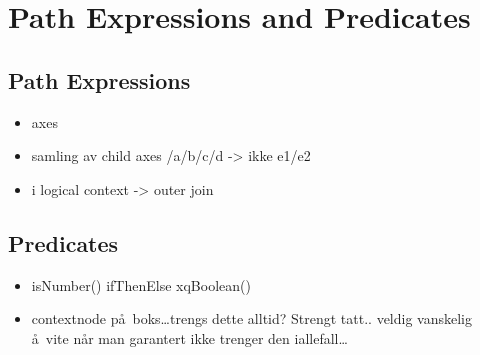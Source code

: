\section{Path Expressions and Predicates}
\label{sect:trans:TD:pathNpred}


\subsection{Path Expressions}
\label{sect:trans:TD:pathExprs}
\begin{itemize}
  \item axes
  \item samling av child axes /a/b/c/d -> ikke e1/e2
  \item i logical context -> outer join
\end{itemize}

\subsection{Predicates}
\label{sect:trans:TD:predicates}
\begin{itemize}
  \item isNumber() ifThenElse xqBoolean()
  \item contextnode p\aa~boks\ldots trengs dette alltid? Strengt tatt.. veldig vanskelig \aa~vite n\aa r man
  garantert ikke trenger den iallefall\ldots
\end{itemize}
